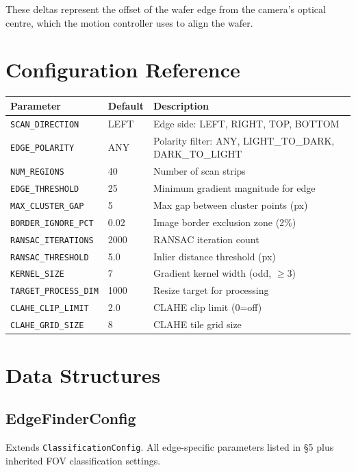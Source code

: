 \documentclass[11pt,a4paper]{article}
\begin{document}
These deltas represent the offset of the wafer edge from the camera's optical centre, which the motion controller uses to align the wafer.

\section{Configuration Reference}

\begin{longtable}{p{4.2cm}p{2.2cm}p{7cm}}\toprule
\textbf{Parameter} & \textbf{Default} & \textbf{Description}\\\midrule\endhead
\texttt{SCAN\_DIRECTION} & LEFT & Edge side: LEFT, RIGHT, TOP, BOTTOM\\
\texttt{EDGE\_POLARITY} & ANY & Polarity filter: ANY, LIGHT\_TO\_DARK, DARK\_TO\_LIGHT\\
\texttt{NUM\_REGIONS} & 40 & Number of scan strips\\
\texttt{EDGE\_THRESHOLD} & 25 & Minimum gradient magnitude for edge\\
\texttt{MAX\_CLUSTER\_GAP} & 5 & Max gap between cluster points (px)\\
\texttt{BORDER\_IGNORE\_PCT} & 0.02 & Image border exclusion zone (2\%)\\
\texttt{RANSAC\_ITERATIONS} & 2000 & RANSAC iteration count\\
\texttt{RANSAC\_THRESHOLD} & 5.0 & Inlier distance threshold (px)\\
\texttt{KERNEL\_SIZE} & 7 & Gradient kernel width (odd, $\geq 3$)\\
\texttt{TARGET\_PROCESS\_DIM} & 1000 & Resize target for processing\\
\texttt{CLAHE\_CLIP\_LIMIT} & 2.0 & CLAHE clip limit (0=off)\\
\texttt{CLAHE\_GRID\_SIZE} & 8 & CLAHE tile grid size\\\bottomrule
\end{longtable}

\section{Data Structures}

\subsection{EdgeFinderConfig}
Extends \texttt{ClassificationConfig}. All edge-specific parameters listed in \S5 plus inherited FOV classification settings.
\end{document}
